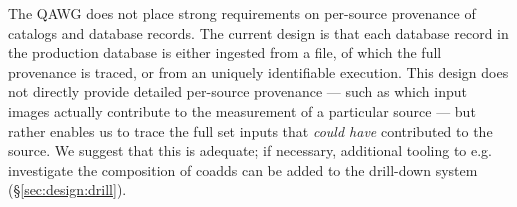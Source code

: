 The QAWG does not place strong requirements on per-source provenance of catalogs and database records.
The current design is that each database record in the production database is either ingested from a file, of which the full provenance is traced, or from an uniquely identifiable execution.
This design does not directly provide detailed per-source provenance --- such as which input images actually contribute to the measurement of a particular source --- but rather enables us to trace the full set inputs that \textit{could have} contributed to the source.
We suggest that this is adequate; if necessary, additional tooling to e.g. investigate the composition of coadds can be added to the drill-down system (\S\ref{sec:design:drill}).
